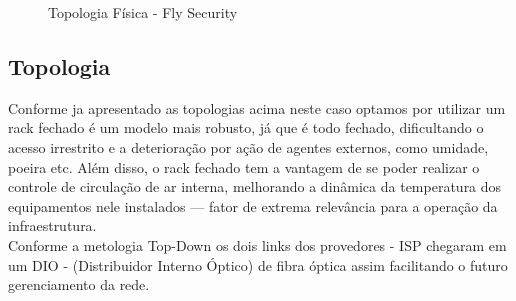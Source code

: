 \documentclass[	DIV=calc,%
							paper=a4,%
							fontsize=12pt,%
							onecolumn]{scrartcl}	 					%
\begin{document}
\clearpage 
\thispagestyle{plain}

\recalctypearea

\begin{figure}
	\noindent{}
	\caption{Topologia Física - Fly Security}
	\label{tpfisica}
\end{figure}

\clearpage
{}
\recalctypearea

\subsection{Topologia}

Conforme ja apresentado as topologias acima neste caso optamos por utilizar um rack fechado é um modelo mais robusto, já que é todo fechado, dificultando o acesso irrestrito e a deterioração por ação de agentes externos, como umidade, poeira etc. Além disso, o rack fechado tem a vantagem de se poder realizar o controle de circulação de ar interna, melhorando a dinâmica da temperatura dos equipamentos nele instalados — fator de extrema relevância para a operação da infraestrutura.
\\

Conforme a metologia Top-Down os dois links dos provedores - ISP chegaram em um DIO - (Distribuidor Interno Óptico) de fibra óptica assim facilitando o futuro gerenciamento da rede. 
\\
\end{document}
